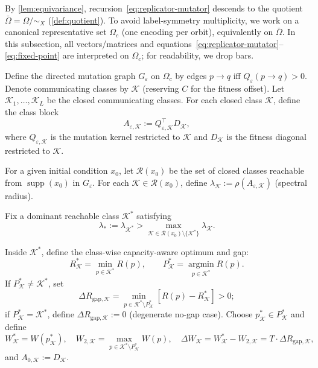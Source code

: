 \documentclass[12pt]{article}
\newcommand{\Qeps}{Q_\varepsilon}
\newcommand{\Obar}{\bar{\Omega}}
\newcommand{\supp}{\operatorname{supp}}
\newcommand{\argmin}{\operatorname*{argmin}}
\begin{document}
By \cref{lem:equivariance}, recursion~\eqref{eq:replicator-mutator} descends to the quotient $\Obar = \Omega/{\sim_X}$ (\cref{def:quotient}). To avoid label-symmetry multiplicity, we work on a canonical representative set $\Omega_c$ (one encoding per orbit), equivalently on $\Obar$. In this subsection, all vectors/matrices and equations~\eqref{eq:replicator-mutator}--\eqref{eq:fixed-point} are interpreted on $\Omega_c$; for readability, we drop bars.

Define the directed mutation graph $G_\varepsilon$ on $\Omega_c$ by edges $p \to q$ iff $\Qeps(p \to q) > 0$. Denote communicating classes by $\mathcal{K}$ (reserving $C$ for the fitness offset). Let $\mathcal{K}_1, \ldots, \mathcal{K}_L$ be the closed communicating classes. For each closed class $\mathcal{K}$, define the class block
\begin{equation}
A_{\varepsilon,\mathcal{K}} := Q_{\varepsilon,\mathcal{K}}^\top D_\mathcal{K},
\end{equation}
where $Q_{\varepsilon,\mathcal{K}}$ is the mutation kernel restricted to $\mathcal{K}$ and $D_\mathcal{K}$ is the fitness diagonal restricted to $\mathcal{K}$.

For a given initial condition $x_0$, let $\mathcal{R}(x_0)$ be the set of closed classes reachable from $\supp(x_0)$ in $G_\varepsilon$. For each $\mathcal{K} \in \mathcal{R}(x_0)$, define $\lambda_\mathcal{K} := \rho(A_{\varepsilon,\mathcal{K}})$ (spectral radius).

Fix a dominant reachable class $\mathcal{K}^*$ satisfying
\begin{equation}\label{eq:dominant-class}
\lambda_* := \lambda_{\mathcal{K}^*} > \max_{\mathcal{K} \in \mathcal{R}(x_0) \setminus \{\mathcal{K}^*\}} \lambda_\mathcal{K}.
\end{equation}

Inside $\mathcal{K}^*$, define the class-wise capacity-aware optimum and gap:
\[
R^*_\mathcal{K} = \min_{p \in \mathcal{K}^*} R(p), \qquad P^*_\mathcal{K} = \argmin_{p \in \mathcal{K}^*} R(p).
\]
If $P^*_\mathcal{K} \ne \mathcal{K}^*$, set
\[
\Delta R_{\mathrm{gap},\mathcal{K}} = \min_{p \in \mathcal{K}^* \setminus P^*_\mathcal{K}} [R(p) - R^*_\mathcal{K}] > 0;
\]
if $P^*_\mathcal{K} = \mathcal{K}^*$, define $\Delta R_{\mathrm{gap},\mathcal{K}} := 0$ (degenerate no-gap case). Choose $p^*_\mathcal{K} \in P^*_\mathcal{K}$ and define
\[
W^*_\mathcal{K} = W(p^*_\mathcal{K}), \quad W_{2,\mathcal{K}} = \max_{p \in \mathcal{K}^* \setminus P^*_\mathcal{K}} W(p), \quad \Delta W_\mathcal{K} = W^*_\mathcal{K} - W_{2,\mathcal{K}} = T \cdot \Delta R_{\mathrm{gap},\mathcal{K}},
\]
and $A_{0,\mathcal{K}} := D_\mathcal{K}$.
\end{document}
